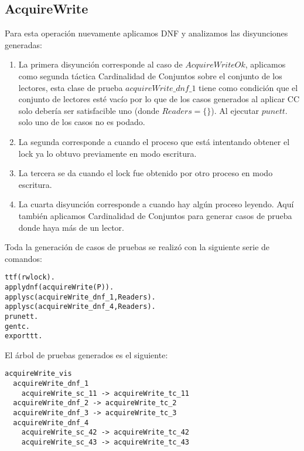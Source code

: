 \documentclass[a4paper, 12pt]{article}
\begin{document}
\subsection{AcquireWrite}
Para esta operación nuevamente aplicamos DNF y analizamos las disyunciones generadas:
\begin{enumerate}
  \item La primera disyunción corresponde al caso de $AcquireWriteOk$, aplicamos como segunda táctica Cardinalidad de Conjuntos sobre el conjunto de los lectores, esta clase de prueba $acquireWrite\_dnf\_1$ tiene como condición que el conjunto de lectores esté vacío por lo que de los casos generados al aplicar CC solo debería ser satisfacible uno (donde $Readers = \{\}$). Al ejecutar $punett.$ solo uno de los casos no es podado.
  \item La segunda corresponde a cuando el proceso que está intentando obtener el lock ya lo obtuvo previamente en modo escritura.
  \item La tercera se da cuando el lock fue obtenido por otro proceso en modo escritura.
  \item La cuarta disyunción corresponde a cuando hay algún proceso leyendo. Aquí también aplicamos Cardinalidad de Conjuntos para generar casos de prueba donde haya más de un lector.
\end{enumerate}

Toda la generación de casos de pruebas se realizó con la siguiente serie de comandos:
\begin{verbatim}
ttf(rwlock).
applydnf(acquireWrite(P)).
applysc(acquireWrite_dnf_1,Readers).
applysc(acquireWrite_dnf_4,Readers).
prunett.
gentc.
exporttt.
\end{verbatim}

El árbol de pruebas generados es el siguiente:

\begin{verbatim}
acquireWrite_vis
  acquireWrite_dnf_1
    acquireWrite_sc_11 -> acquireWrite_tc_11
  acquireWrite_dnf_2 -> acquireWrite_tc_2
  acquireWrite_dnf_3 -> acquireWrite_tc_3
  acquireWrite_dnf_4
    acquireWrite_sc_42 -> acquireWrite_tc_42
    acquireWrite_sc_43 -> acquireWrite_tc_43
\end{verbatim}
\end{document}
